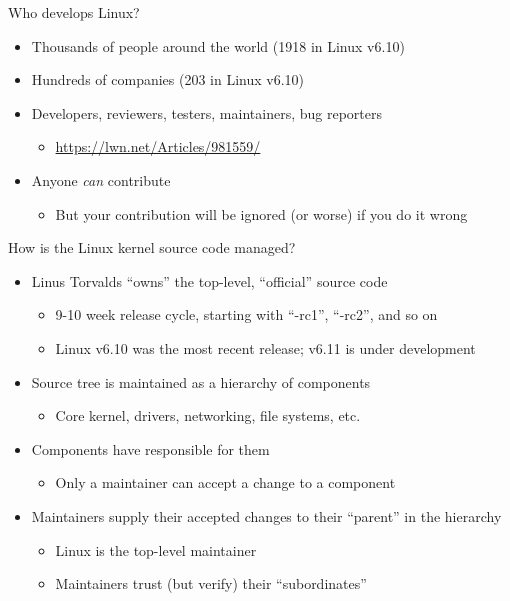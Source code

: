 \documentclass[aspectratio=169, notes]{beamer}
\begin{document}
\begin{frame}{Who develops Linux?}
	\begin{itemize}
	\item Thousands of people around the world (1918 in Linux v6.10)
	\item Hundreds of companies (203 in Linux v6.10)
	\item Developers, reviewers, testers, maintainers, bug reporters
		\begin{itemize}
		\item \url{https://lwn.net/Articles/981559/}
		\end{itemize}
	\item Anyone \emph{can} contribute
		\begin{itemize}
		\item But your contribution will be ignored (or worse) if you do it wrong
		\end{itemize}
	\end{itemize}
\end{frame}

\begin{frame}{How is the Linux kernel source code managed?}
	\begin{itemize}
	\item Linus Torvalds ``owns'' the top-level, ``official'' source code
		\begin{itemize}
		\item 9-10 week release cycle, starting with ``-rc1'', ``-rc2'', and so on
		\item Linux v6.10 was the most recent release; v6.11 is under development
		\end{itemize}
	\item Source tree is maintained as a hierarchy of components
		\begin{itemize}
		\item Core kernel, drivers, networking, file systems, etc.
		\end{itemize}
	\item Components have  responsible for them
		\begin{itemize}
		\item Only a maintainer can accept a change to a component
		\end{itemize}
	\item Maintainers supply their accepted changes to their ``parent'' in the hierarchy
		\begin{itemize}
		\item Linux is the top-level maintainer
		\item Maintainers trust (but verify) their ``subordinates''
		\end{itemize}
	\end{itemize}
\end{frame}
\end{document}
